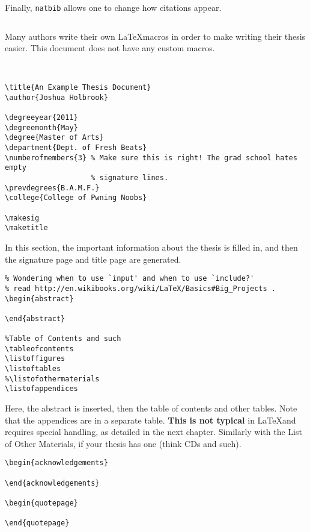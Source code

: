 Finally, \texttt{natbib} allows one to change how citations appear.

\small
\begin{verbatim}

\end{verbatim}
\normalsize

Many authors write their own \LaTeX macros in order to make writing their thesis
easier. This document does not have any custom macros.

\small
\begin{verbatim}


\title{An Example Thesis Document}
\author{Joshua Holbrook}

\degreeyear{2011}
\degreemonth{May}
\degree{Master of Arts}
\department{Dept. of Fresh Beats}
\numberofmembers{3} % Make sure this is right! The grad school hates empty
                    % signature lines.
\prevdegrees{B.A.M.F.}
\college{College of Pwning Noobs}

\makesig
\maketitle
\end{verbatim}
\normalsize

In this section, the important information about the thesis is filled in, and
then the signature page and title page are generated.

\small
\begin{verbatim}
% Wondering when to use `input' and when to use `include?'
% read http://en.wikibooks.org/wiki/LaTeX/Basics#Big_Projects .
\begin{abstract}
  
\end{abstract}

%Table of Contents and such
\tableofcontents
\listoffigures
\listoftables
%\listofothermaterials
\listofappendices
\end{verbatim}
\normalsize

Here, the abstract is inserted, then the table of contents and other tables.
Note that the appendices are in a separate table. \textbf{This is not typical}
in \LaTeX and requires special handling, as detailed in the next chapter.
Similarly with the List of Other Materials, if your thesis has one (think
CDs and such).

\small
\begin{verbatim}
\begin{acknowledgements}
  
\end{acknowledgements}

\begin{quotepage}
  
\end{quotepage}




\end{verbatim}
\normalsize

